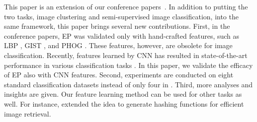 \documentclass[preprint,12pt,3p]{elsarticle}
\begin{document}
This paper is an extension of our conference papers~\citep{dai:eccv12b,dai:iccv13b}. 
In addition to putting the two tasks, image clustering and semi-supervised image classification, 
into the same framework, this paper brings several new
contributions. First, in the conference papers, EP
was validated only with hand-crafted features, such as LBP
\citep{Ojala02}, GIST \citep{gist}, and PHOG
\citep{Bosch:iccv07}. These features, however, are obsolete for image classification. 
Recently, features learned by CNN has resulted in
state-of-the-art performance in various classification tasks
\citep{nips12:cnn, caffe14, rich:feature:cvpr14, deep:bmvc14}. In this
paper, we validate the efficacy of EP also with CNN features. Second, experiments are 
conducted on eight standard classification
datasets instead of only four in \citep{dai:iccv13b}. Third, 
more analyses and insights are given. 
Our feature learning method can be used for other tasks as well. For instance, 
\citep{random:hashing} extended the idea to generate hashing functions
for efficient image retrieval.
\end{document}
